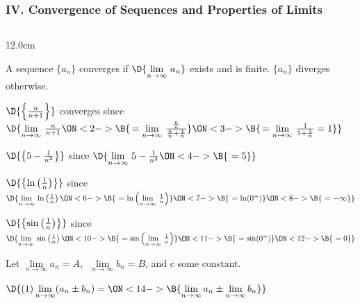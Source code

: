 \begin{frame}
\frametitle{IV. Convergence of Sequences and Properties of Limits}
\scriptsize
\begin{columns}
\begin{column}{12.0cm}

A sequence $\{a_n\}$ converges if $\D{\lim \limits_{n \to \infty}\, a_n}$ exists and is finite.  $\{a_n\}$ diverges otherwise.

\vspace{0.2cm}

\EX $\D{\left\{\frac{n}{n+1}\right\}}$ \quad converges \quad since \quad 
$\D{	\lim \limits_{n \to \infty}\, \frac{n}{n+1} 
\ON<2->{\B{\, = \lim \limits_{n \to \infty}\, \frac{\frac{n}{n}}{\frac{n}{n}+\frac{1}{n}}}} 
\ON<3->{\B{\, = \lim \limits_{n \to \infty}\, \frac{1}{1+\frac{1}{n}} = 1}}}$

\vspace{0.4cm}

\EX $\D{\left\{5 - \frac{1}{n^2}\right\}}$ \quad
{} \quad since \quad
$\D{
\lim \limits_{n \to \infty}\, 5 - \frac{1}{n^2}
\ON<4->{\B{\,\, = 5}}}$

\vspace{0.4cm}

\EX $\D{\left\{\ln\left(\frac{1}{n}\right)\right\}}$ \quad
{} \quad since \quad
$\D{
\lim \limits_{n \to \infty}\, \ln\left(\frac{1}{n}\right) 
\ON<6->{\B{\,\, = \ln\left( \lim \limits_{n \to \infty}\, \frac{1}{n}\right)}}
\ON<7->{\B{\,\,= \ln(0^+)}}
\ON<8->{\B{\,\,= -\infty}}}$

\vspace{0.4cm}

\EX $\D{\left\{\sin\left(\frac{1}{n}\right)\right\}}$ \quad
{} \quad since \quad
$\D{
\lim \limits_{n \to \infty}\, \sin\left(\frac{1}{n}\right) 
\ON<10->{\B{\,\, = \sin\left( \lim \limits_{n \to \infty}\, \frac{1}{n}\right)}}
\ON<11->{\B{\,\,= \sin(0^+)}}
\ON<12->{\B{\,\,= 0}}}$

\vspace{0.6cm}

Let $\lim \limits_{n \to \infty} a_n = A$, $\,\,\lim \limits_{n \to \infty} b_n = B$, and c some constant.

\vspace{0.2cm}

$\D{
(1) \lim \limits_{n \to \infty} (a_n \pm b_n) = 
\ON<14->{\B{\lim \limits_{n \to \infty} a_n \pm \lim \limits_{n \to \infty} b_n}}}$


\end{column}
\end{columns}
\end{frame}
